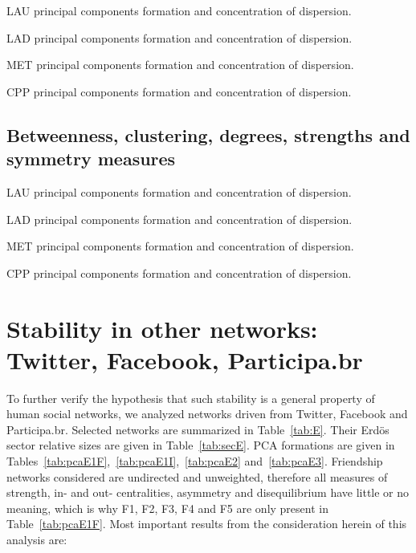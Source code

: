 \documentclass[%
 aip,
 jmp,%
 amsmath,amssymb,
 reprint,%
 floatfix,
]{revtex4-1}
\begin{document}
\begin{table}[!h]
	\caption{LAU principal components formation and concentration of dispersion.}
	\footnotesize
	
\label{tab:pcain}
\end{table}
\begin{table}[!h]
	\caption{LAD principal components formation and concentration of dispersion.}
	\footnotesize
	
\label{tab:pcain}
\end{table}
\begin{table}[!h]
	\caption{MET principal components formation and concentration of dispersion.}
	\footnotesize
	
\label{tab:pcain}
\end{table}
\begin{table}[!h]
	\caption{CPP principal components formation and concentration of dispersion.}
	\footnotesize
	
\label{tab:pcain}
\end{table}


\FloatBarrier
\subsection{Betweenness, clustering, degrees, strengths and symmetry measures}

\begin{table}[!h]
	\caption{LAU principal components formation and concentration of dispersion.}
	\footnotesize
	
\label{tab:pcain}
\end{table}
\begin{table}[!h]
	\caption{LAD principal components formation and concentration of dispersion.}
	\footnotesize
	
\label{tab:pcain}
\end{table}
\begin{table}[!h]
	\caption{MET principal components formation and concentration of dispersion.}
	\footnotesize
	
\label{tab:pcain}
\end{table}
\begin{table}[!h]
	\caption{CPP principal components formation and concentration of dispersion.}
	\footnotesize
	
\label{tab:pcain}
\end{table}


\section{Stability in other networks: Twitter, Facebook, Participa.br}\label{si:ext}
To further verify the hypothesis that such stability is a general property of human social networks,
we analyzed networks driven from Twitter, Facebook and Participa.br. Selected networks are summarized in
Table~\ref{tab:E}. Their Erd\"os sector relative sizes are given in Table~\ref{tab:secE}. PCA formations are given in
Tables~\ref{tab:pcaE1F},~\ref{tab:pcaE1I},~\ref{tab:pcaE2} and~\ref{tab:pcaE3}. Friendship networks considered are undirected and unweighted,
therefore all measures of strength, in- and out- centralities, asymmetry and disequilibrium have little or no meaning, which is why F1, F2, F3, F4 and F5 are only present in Table~\ref{tab:pcaE1F}.
Most important results from the consideration herein of this analysis are:
\end{document}
